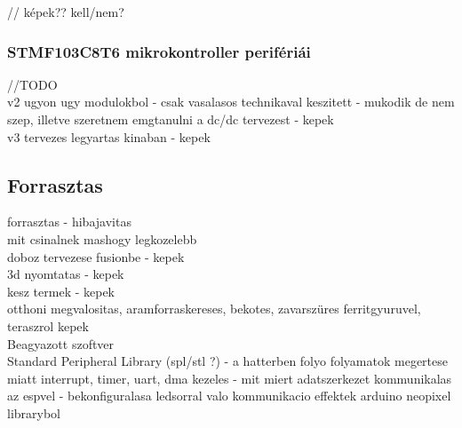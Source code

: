 \documentclass[../main.tex]{subfiles}
\begin{document}
            // képek?? kell/nem?
        
        \subsubsection{STMF103C8T6 mikrokontroller perifériái}
        
        
        
        
        
        
        
//TODO\\
v2 ugyon ugy modulokbol - csak vasalasos technikaval keszitett - mukodik de nem szep, illetve szeretnem emgtanulni a dc/dc tervezest - kepek\\
v3 tervezes legyartas kinaban - kepek\\ 

    \subsection{Forrasztas}
forrasztas - hibajavitas\\
mit csinalnek mashogy legkozelebb\\

doboz tervezese fusionbe - kepek\\
3d nyomtatas - kepek\\
kesz termek - kepek\\

otthoni megvalositas, aramforraskereses, bekotes, zavarszüres ferritgyuruvel, teraszrol kepek\\

Beagyazott szoftver\\
Standard Peripheral Library (spl/stl ?) - a hatterben folyo folyamatok megertese miatt
interrupt, timer, uart, dma kezeles - mit miert
adatszerkezet
kommunikalas az espvel - bekonfiguralasa
ledsorral valo kommunikacio
effektek arduino neopixel librarybol 
\end{document}
